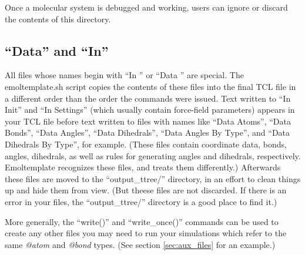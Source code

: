\documentclass[11pt]{article}
\begin{document}
Once a molecular system is debugged and working, users 
can ignore or discard the contents of this directory.


\subsection{``Data'' and ``In''}
\label{sec:DataIn}

All files whose names begin with ``In '' or ``Data '' are special.
The emoltemplate.sh script copies the contents 
of these files into the final TCL file in a different order than the
order the commands were issued.
Text written to ``In Init'' and ``In Settings''
(which usually contain force-field parameters)
appears in your TCL file before text written to files with names like
``Data Atoms'', ``Data Bonds'', ``Data Angles'',
``Data Dihedrals'', 
``Data Angles By Type'', and
``Data Dihedrals By Type'',
for example.
(These files contain coordinate data, bonds, angles, dihedrals,
as well as rules for generating angles and dihedrals, respectively.
Emoltemplate recognizes these files, and treats them differently.)
Afterwards these files are moved to the ``output\_ttree/'' directory, 
in an effort to clean things up and hide them from view.
(But theese files are not discarded.  If there is an error in your files,
the ``output\_ttree/'' directory is a good place to find it.)

More generally, the ``write()'' and ``write\_once()'' commands can be used to
create any other files you may need to run your simulations
which refer to the same \textit{@atom} and \textit{@bond} types.
(See section \ref{sec:aux_files} 
for an example.)

\end{document}
